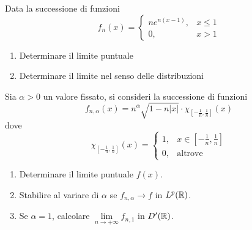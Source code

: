 Data la successione di funzioni
\begin{equation*}
f_{n}( x) =\begin{cases}
ne^{n( x-1)} , & x\leqslant 1\\
0, & x >1
\end{cases}
\end{equation*}
\begin{enumerate}
\item Determinare il limite puntuale
\item Determinare il limite nel senso delle distribuzioni
\end{enumerate}
\Esercizio{}

Sia $\alpha  >0$ un valore fissato, si consideri la successione di funzioni
\begin{equation*}
f_{n,\alpha }( x) =n^{\alpha }\sqrt{1-n| x| } \cdotp \chi _{\left[ -\frac{1}{n} ,\frac{1}{n}\right]}( x)
\end{equation*}
dove
\begin{equation*}
\chi _{\left[ -\frac{1}{n} ,\frac{1}{n}\right]}( x) =\begin{cases}
1, & x\in \left[ -\frac{1}{n} ,\frac{1}{n}\right]\\
0, & \text{altrove}
\end{cases}
\end{equation*}
\begin{enumerate}
\item Determinare il limite puntuale $f( x)$.
\item Stabilire al variare di $\alpha $ se $f_{n,\alpha }\rightarrow f$ in $L^{p}(\mathbb{R} )$.
\item Se $\alpha =1$, calcolare $\lim\limits _{n\rightarrow +\infty } f_{n,1}$ in $D'(\mathbb{R} )$.
\end{enumerate}
\ParteSoluzioni
\Soluzione
